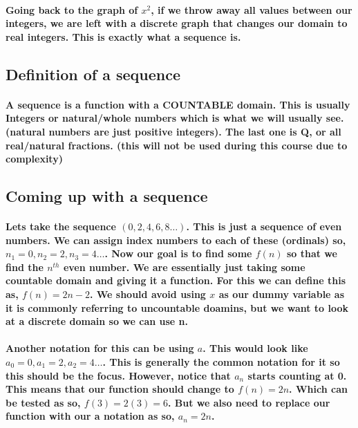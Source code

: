 \paragraph{Going back to the graph of $x^2$, if we throw away all values between our integers, we are left with a discrete graph that changes our domain to real integers. This is exactly what a sequence is. }

\subsection{Definition of a sequence}%
\label{sub:Definition of a sequence}
\paragraph{A sequence is a function with a COUNTABLE domain. This is usually Integers or natural/whole numbers which is what we will usually see. (natural numbers are just positive integers). The last one is Q, or all real/natural fractions. (this will not be used during this course due to complexity) }

\newpage
\subsection{Coming up with a sequence}%
\label{sub:Coming up with a sequence}
\paragraph{Lets take the sequence $\left( 0,2,4,6,8 \ldots \right) $. This is just a sequence of even numbers. We can assign index numbers to each of these (ordinals) so, $n_1 = 0, n_2 = 2, n_3 = 4 \ldots$. Now our goal is to find some $f\left( n \right) $ so that we find the $n^{th}$ even number. We are essentially just taking some countable domain and giving it a function. For this we can define this as, $f\left( n \right) =2n-2$. We should avoid using $x$ as our dummy variable as it is commonly referring to uncountable doamins, but we want to look at a discrete domain so we can use n. }

\paragraph{Another notation for this can be using $a$. This would look like $a_0 = 0, a_1 = 2, a_2 = 4 \ldots$. This is generally the common notation for it so this should be the focus. However, notice that $a_n$ starts counting at 0. This means that our function should change to $f\left( n \right) =2n$. Which can be tested as so, $f\left( 3 \right) =2\left( 3 \right) =6$. But we also need to replace our function with our a notation as so, $a_n=2n$. }


